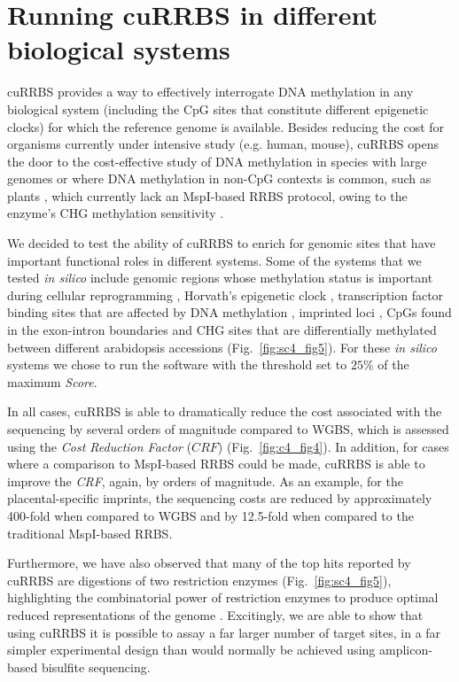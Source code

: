 \section{Running cuRRBS in different biological systems}

\smallskip

cuRRBS provides a way to effectively interrogate DNA methylation in any biological system (including the CpG sites that constitute different epigenetic clocks) for which the reference genome is available. Besides reducing the cost for organisms currently under intensive study (e.g. human, mouse), cuRRBS opens the door to the cost-effective study of DNA methylation in species with large genomes or where DNA methylation in non-CpG contexts is common, such as plants \cite{Stroud2013}, which currently lack an MspI-based RRBS protocol, owing to the enzyme’s CHG methylation sensitivity \cite{Sun2014}.

\bigskip

We decided to test the ability of cuRRBS to enrich for genomic sites that have important functional roles in different systems. Some of the systems that we tested \textit{in silico} include genomic regions whose methylation status is important during cellular reprogramming \cite{Milagre2017}, Horvath's epigenetic clock \cite{Horvath2013}, transcription factor binding sites that are affected by DNA methylation \cite{Maurano2015,Domcke2015}, imprinted loci \cite{Hanna2016}, CpGs found in the exon-intron boundaries \cite{LevMaor2015} and CHG sites that are differentially methylated between different arabidopsis accessions \cite{Kawakatsu2016} (Fig.~\ref{fig:sc4_fig5}). For these \textit{in silico} systems we chose to run the software with the threshold set to $25\%$ of the maximum \textit{Score}.

\bigskip

In all cases, cuRRBS is able to dramatically reduce the cost associated with the sequencing by several orders of magnitude compared to WGBS, which is assessed using the \textit{Cost Reduction Factor} ($CRF$) (Fig.~\ref{fig:c4_fig4}). In addition, for cases where a comparison to MspI-based RRBS could be made, cuRRBS is able to improve the \textit{CRF}, again, by orders of magnitude. As an example, for the placental-specific imprints, the sequencing costs are reduced by approximately 400-fold when compared to WGBS and by 12.5-fold when compared to the traditional MspI-based RRBS.

\bigskip

Furthermore, we have also observed that many of the top hits reported by cuRRBS are digestions of two restriction enzymes (Fig.~\ref{fig:sc4_fig5}), highlighting the combinatorial power of restriction enzymes to produce optimal reduced representations of the genome \cite{Bystrykh2013}. Excitingly, we are able to show that using cuRRBS it is possible to assay a far larger number of target sites, in a far simpler experimental design than would normally be achieved using amplicon-based bisulfite sequencing.


